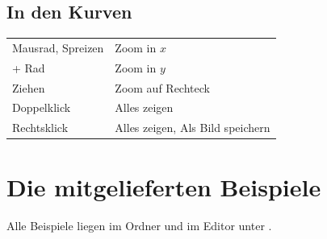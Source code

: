 \section*{In den Kurven}

\begin{tabularx}{\textwidth}{@{}P{4.5cm}L@{}}
  \toprule
  Mausrad, Spreizen & Zoom in $x$ \\
   + Rad & Zoom in $y$ \\
  Ziehen & Zoom auf Rechteck \\
  Doppelklick & Alles zeigen \\
  Rechtsklick & Alles zeigen, Als Bild speichern \\
  \bottomrule
\end{tabularx}

\chapter{Die mitgelieferten Beispiele}
\label{sec:beispiele}

Alle Beispiele liegen im Ordner  und im Editor unter
\pfad{}.

